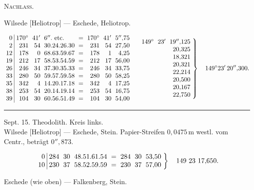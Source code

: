 \clearpage
{}\hfill\textsc{Nachlass.}\hfill\mbox{}\par\medskip
\begin{center}Wilsede [Heliotrop] --- Eschede, Heliotrop.\end{center}
\[
\setlength{\arraycolsep}{3pt}
\begin{array}{r|rrlcrrr}
0&170^\circ&41'&6''.\ \text{etc.}&=&170^\circ&41'&5''{,}75\\
2&231&54&30.24.26.30&=&231&54&27{,}50\\
12&178&0&68.63.59.67&=&178&1&4{,}25\\
19&212&17&58.53.54.59&=&212&17&56{,}00\\
26&246&34&37.30.35.33&=&246&34&33{,}75\\
33&280&50&59.57.59.58&=&280&50&58{,}25\\
35&342&4&14.20.17.18&=&342&4&17{,}25\\
38&253\rlap{\hspace{.13em}\raisebox{.9ex}{\text{\tiny.}}}&54&20.14.19.14&=&253&54&16{,}75\\
39&104&30&60.56.51.49&=&104&30&54{,}00
\end{array}
\quad
\left.\begin{array}{rrr}
149^\circ&23'&19''{,}125\\&&20{,}325\\&&18{,}321\\&&20{,}321\\
&&22{,}214\\&&20{,}500\\&&20{,}167\\&&22{,}750
\end{array}\right\}\quad149^\circ23'\,20''{,}300.
\]
\noindent\rule{\textwidth}{.4pt}
\begin{center}
Sept. 15. Theodolith. Kreis links.\\[4pt]
Wilsede [Heliotrop] --- Eschede, Stein. Papier-Streifen $0{,}0475\,\mathrm m$ westl. vom Centr., beträgt $0''{,}873$.
\end{center}
\[
\setlength{\arraycolsep}{3pt}
\left.\begin{array}{r|rrlcrrr}
0&284&30&48.51.61.54&=&284&30&53{,}50\\
10&230&37&58.52.59.59&=&230&37&57{,}00
\end{array}\right\}\quad149\ 23\ 17{,}650.
\]
\begin{center}Eschede (wie oben) --- Falkenberg, Stein.\end{center}
